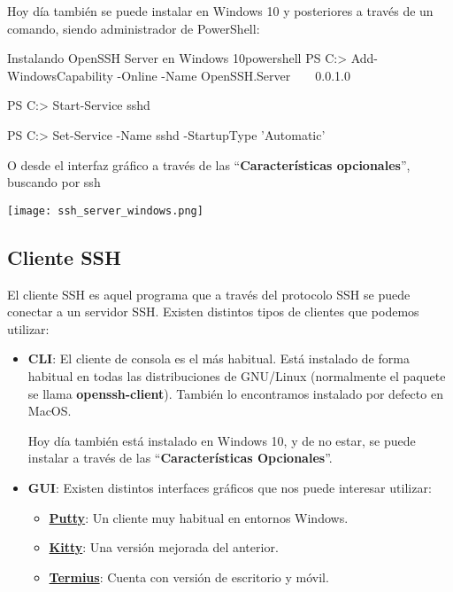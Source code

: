 Hoy día también se puede instalar en Windows 10 y posteriores a través de un comando, siendo administrador de PowerShell:

\begin{mycode}{Instalando OpenSSH Server en Windows 10}{powershell}{{\footnotesize }}
PS C:\Windows{}> Add-WindowsCapability -Online -Name OpenSSH.Server~~~~0.0.1.0

PS C:\Windows{}> Start-Service sshd

PS C:\Windows{}> Set-Service -Name sshd -StartupType 'Automatic'
\end{mycode}

O desde el interfaz gráfico a través de las “\textbf{Características opcionales}”, buscando por ssh
\begin{center}
    \texttt{[image: ssh\_server\_windows.png]}
\end{center}


\subsection{Cliente SSH}
El cliente SSH es aquel programa que a través del protocolo SSH se puede conectar a un servidor SSH. Existen distintos tipos de clientes que podemos utilizar:

\begin{itemize}
    \item \textbf{CLI}: El cliente de consola es el más habitual. Está instalado de forma habitual en todas las distribuciones de GNU/Linux (normalmente el paquete se llama \textbf{openssh-client}). También lo encontramos instalado por defecto en MacOS.

    Hoy día también está instalado en Windows 10, y de no estar, se puede instalar a través de las “\textbf{Características Opcionales}”.

    \item \textbf{GUI}: Existen distintos interfaces gráficos que nos puede interesar utilizar:
    \begin{itemize}
        \item \textbf{\href{https://putty.org/}{Putty}}: Un cliente muy habitual en entornos Windows.
        \item \textbf{\href{https://github.com/cyd01/KiTTY/}{Kitty}}: Una versión mejorada del anterior.
        \item \textbf{\href{https://www.termius.com/}{Termius}}: Cuenta con versión de escritorio y móvil.
    \end{itemize}
\end{itemize}


